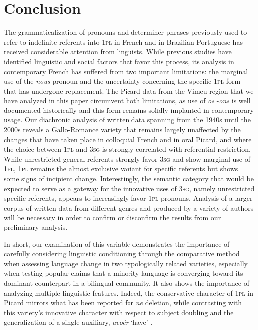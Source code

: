 \documentclass[output=paper,colorlinks,citecolor=brown]{langscibook}
\begin{document}
\section{Conclusion}
The grammaticalization of pronouns and determiner phrases previously used to refer to indefinite referents into 1\textsc{pl} in French and in Brazilian Portuguese has received considerable attention from linguists. While previous studies have identified linguistic and social factors that favor this process, its analysis in contemporary French has suffered from two important limitations: the marginal use of the \textit{nous} pronoun and the uncertainty concerning the specific 1\textsc{pl} form that has undergone replacement. The Picard data from the Vimeu region that we have analyzed in this paper circumvent both limitations, as use of \textit{os} -\textit{ons} is well documented historically and this form remains solidly implanted in contemporary usage. Our diachronic analysis of written data spanning from the 1940s until the 2000s reveals a Gallo-Romance variety that remains largely unaffected by the changes that have taken place in colloquial French and in oral Picard, and where the choice between 1\textsc{pl} and 3\textsc{sg} is strongly correlated with referential restriction. While unrestricted general referents strongly favor 3\textsc{sg} and show marginal use of 1\textsc{pl}, 1\textsc{pl} remains the almost exclusive variant for specific referents but shows some signs of incipient change. Interestingly, the semantic category that would be expected to serve as a gateway for the innovative uses of 3\textsc{sg}, namely unrestricted specific referents, appears to increasingly favor 1\textsc{pl} pronouns. Analysis of a larger corpus of written data from different genres and produced by a variety of authors will be necessary in order to confirm or disconfirm the results from our preliminary analysis.

In short, our examination of this variable demonstrates the importance of carefully considering linguistic conditioning through the comparative method when assessing language change in two typologically related varieties, especially when testing popular claims that a minority language is converging toward its dominant counterpart in a bilingual community. It also shows the importance of analyzing multiple linguistic features. Indeed, the conservative character of 1\textsc{pl} in Picard mirrors what has been reported for \textit{ne} deletion, while contrasting with this variety’s innovative character with respect to subject doubling and the generalization of a single auxiliary, \textit{avoér} ‘have’ \citep{auger_using_2017, auger_building_2019, villeneuve_chtileu_2013}.

\printbibliography[heading=subbibliography,notkeyword=this]
\end{document}
